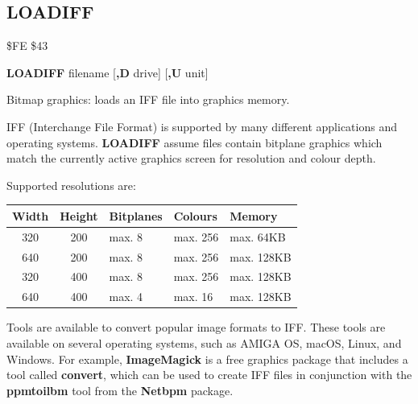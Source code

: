 
\newpage
\subsection{LOADIFF}
\begin{description}[leftmargin=2cm,style=nextline]
\item [Token:]    \$FE \$43

\item [Format:]   {\bf LOADIFF} filename [{\bf,D} drive] [{\bf,U} unit]

\item [Usage:]    Bitmap graphics: loads an IFF file into graphics memory.

                  IFF (Interchange File Format) is supported by many different applications and operating systems. {\bf LOADIFF} assume files contain bitplane graphics which match the currently active graphics screen for resolution and colour depth.

                  Supported resolutions are:

                  \begin{center}
                  \setlength{\tabcolsep}{1mm}
                  \begin{tabular}{|c|c|l|l|l|}
                  \hline
                  {\bf Width} & {\bf Height} & {\bf Bitplanes} & {\bf Colours} & {\bf Memory} \\
                  \hline
                  320         &  200    & max. 8     & max. 256 & max. 64KB \\
                  640         &  200    & max. 8     & max. 256 & max. 128KB \\
                  320         &  400    & max. 8     & max. 256 & max. 128KB \\
                  640         &  400    & max. 4     & max.  16 & max. 128KB \\
                  \hline
                  \end{tabular}
                  \end{center}

                  \filenamedefinition

                  \drivedefinition

                  \unitdefinition

\item [Remarks:]  Tools are available to convert popular image formats to IFF. These tools are available on several operating systems, such as AMIGA OS, macOS, Linux, and Windows.
                  For example, {\bf ImageMagick} is a free graphics package that includes a tool called {\bf convert}, which can be used to create IFF files in conjunction with the {\bf ppmtoilbm} tool from the {\bf Netbpm} package.


\end{description}
